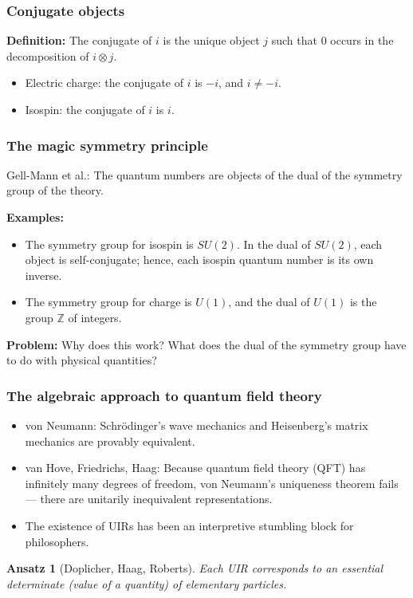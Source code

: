 \documentclass{beamer}
\newtheorem{ansatz}{Ansatz}
\begin{document}
\begin{frame}
\frametitle{Conjugate objects}
\textbf{Definition:} The conjugate of $i$ is the unique object $j$
such that $0$ occurs in the decomposition of $i\otimes j$. \pause

\bigskip
\begin{itemize}
\item Electric charge: the conjugate of $i$ is $-i$, and $i\neq
  -i$.\pause
\item Isospin: the conjugate of $i$ is $i$.
\end{itemize}
\end{frame}


\begin{frame}\frametitle{The magic symmetry principle}

  Gell-Mann et al.: The quantum numbers are objects of the dual of the
  symmetry group of the theory. \pause

  \bigskip

  \textbf{Examples:} 
\begin{itemize}
\item The symmetry group for isospin is $SU(2)$.  In the dual of
  $SU(2)$, each object is self-conjugate; hence, each isospin quantum
  number is its own inverse. \pause 
\item The symmetry group for charge is $U(1)$, and the dual of
  $U(1)$ is the group $\mathbb{Z}$ of integers. \pause \end{itemize}

\bigskip

\textbf{Problem:} Why does this work?  What does the dual of the
  symmetry group have to do with physical quantities?

\end{frame}


\begin{frame}
  \frametitle{The algebraic approach to quantum field theory}

\begin{itemize}
\item von Neumann: Schr{\"o}dinger's wave mechanics and Heisenberg's
  matrix mechanics are provably equivalent. \pause
\item van Hove, Friedrichs, Haag: Because quantum field theory (QFT)
  has infinitely many degrees of freedom, von Neumann's uniqueness
  theorem fails --- there are unitarily inequivalent
  representations. \pause
\item The existence of UIRs has been an interpretive stumbling block
  for philosophers. \pause
\end{itemize}

\begin{ansatz}[Doplicher, Haag, Roberts]
  Each UIR corresponds to an essential determinate (value of a
  quantity) of elementary particles.
\end{ansatz} 
\end{frame}
\end{document}
